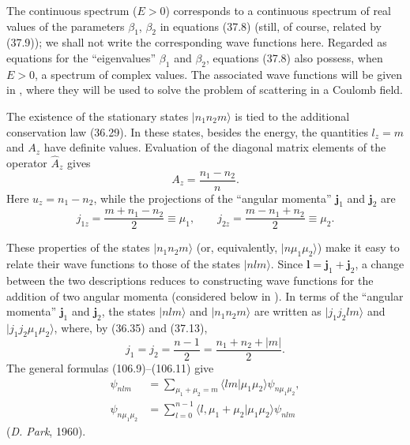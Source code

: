 The continuous spectrum ($E>0$) corresponds to a continuous spectrum of real
values of the parameters $\beta_1$, $\beta_2$ in equations (37.8) (still, of
course, related by (37.9)); we shall not write the corresponding wave
functions here. Regarded as equations for the ``eigenvalues'' $\beta_1$ and
$\beta_2$, equations (37.8) also possess, when $E>0$, a spectrum of complex
values. The associated wave functions will be given in , where they
will be used to solve the problem of scattering in a Coulomb field.

The existence of the stationary states $|n_1n_2m\rangle$ is tied to the
additional conservation law (36.29). In these states, besides the energy, the
quantities $l_z=m$ and $A_z$ have definite values. Evaluation of the diagonal
matrix elements of the operator $\hat A_z$ gives
\begin{equation}
  A_z=\frac{n_1-n_2}{n}.
  \tag{37.17}
\end{equation}
Here $u_z=n_1-n_2$, while the projections of the ``angular momenta''
$\mathbf j_1$ and $\mathbf j_2$ are
\begin{equation}
  j_{1z}=\frac{m+n_1-n_2}{2}\equiv\mu_1,\qquad
  j_{2z}=\frac{m-n_1+n_2}{2}\equiv\mu_2.
  \tag{37.18}
\end{equation}

These properties of the states $|n_1n_2m\rangle$ (or, equivalently,
$|n\mu_1\mu_2\rangle$) make it easy to relate their wave functions to those
of the states $|nlm\rangle$. Since $\mathbf l=\mathbf j_1+\mathbf j_2$, a
change between the two descriptions reduces to constructing wave functions
for the addition of two angular momenta (considered below in ). In terms
of the ``angular momenta'' $\mathbf j_1$ and $\mathbf j_2$, the states
$|nlm\rangle$ and $|n_1n_2m\rangle$ are written as
$|j_1j_2lm\rangle$ and $|j_1j_2\mu_1\mu_2\rangle$, where, by (36.35) and
(37.13),
\begin{equation}
  j_1=j_2=\frac{n-1}{2}=\frac{n_1+n_2+|m|}{2}.
  \tag{37.19}
\end{equation}
The general formulas (106.9)--(106.11) give
\begin{equation}
 \begin{aligned}
  \psi_{nlm}&=\sum_{\mu_1+\mu_2=m}
   \langle lm|\mu_1\mu_2\rangle\psi_{n\mu_1\mu_2},\\
  \psi_{n\mu_1\mu_2}&=\sum_{l=0}^{n-1}
   \langle l,\mu_1+\mu_2|\mu_1\mu_2\rangle\psi_{nlm}
 \end{aligned}
 \tag{37.20}
\end{equation}
(\emph{D. Park}, 1960).
